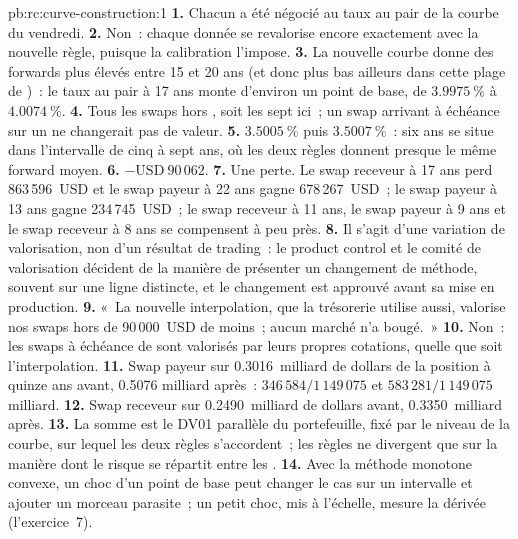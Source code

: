 \begin{solution}{pb:rc:curve-construction:1}
\textbf{1.} Chacun a été négocié au taux au pair de la courbe du vendredi.
\textbf{2.} Non~: chaque donnée se revalorise encore exactement avec la nouvelle règle, puisque
la calibration l'impose.
\textbf{3.} La nouvelle courbe donne des forwards plus élevés entre 15 et 20 ans
(et donc plus bas ailleurs dans cette plage de )~: le taux au pair à 17 ans
monte d'environ un point de base, de $3.9975~\%$ à $4.0074~\%$.
\textbf{4.} Tous les swaps hors , soit les sept ici~; un swap arrivant à échéance
sur un  ne changerait pas de valeur.
\textbf{5.} $3.5005~\%$ puis $3.5007~\%$~: six ans se situe dans l'intervalle de cinq à sept ans,
où les deux règles donnent presque le même forward moyen.
\textbf{6.} $-\text{USD}~90\,062$.
\textbf{7.} Une perte. Le swap receveur à 17 ans perd 863\,596~USD et le swap payeur à 22 ans
gagne 678\,267~USD~; le swap payeur à 13 ans gagne 234\,745~USD~; le swap receveur à 11 ans, le swap payeur à 9 ans
et le swap receveur à 8 ans se compensent à peu près.
\textbf{8.} Il s'agit d'une variation de valorisation, non d'un résultat de trading~: le product control et le comité de valorisation
décident de la manière de présenter un changement de méthode, souvent sur une ligne distincte,
et le changement est approuvé avant sa mise en production.
\textbf{9.} «~La nouvelle interpolation, que la trésorerie utilise aussi, valorise nos swaps hors 
de 90\,000~USD de moins~; aucun marché n'a bougé.~»
\textbf{10.} Non~: les swaps à échéance de  sont valorisés par leurs propres
cotations, quelle que soit l'interpolation.
\textbf{11.} Swap payeur sur 0.3016~milliard de dollars de la position à quinze ans avant, 0.5076
milliard après~: $346\,584/1\,149\,075$ et $583\,281/1\,149\,075$ milliard.
\textbf{12.} Swap receveur sur 0.2490~milliard de dollars avant, 0.3350~milliard après.
\textbf{13.} La somme est le DV01 parallèle du portefeuille, fixé par le niveau de la courbe,
sur lequel les deux règles s'accordent~; les règles ne divergent que sur la manière dont le risque
se répartit entre les .
\textbf{14.} Avec la méthode monotone convexe, un choc d'un point de base peut changer le cas
sur un intervalle et ajouter un morceau parasite~; un petit choc, mis à l'échelle, mesure
la dérivée (l'exercice~7).

\end{solution}
